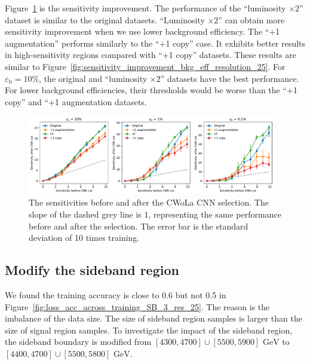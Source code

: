 \documentclass[12pt]{article}
\begin{document}
		Figure~\ref{fig:sensitivity_improvement_aug_1_x2_copy_1_res_25} is the sensitivity improvement. The performance of the ``luminosity $\times 2$'' dataset is similar to the original datasets. ``Luminosity $\times 2$'' can obtain more sensitivity improvement when we use lower background efficiency. The ``+1 augmentation'' performs similarly to the ``+1 copy'' case. It exhibits better results in high-sensitivity regions compared with ``+1 copy'' datasets. These results are similar to Figure~\ref{fig:sensitivity_improvement_bkg_eff_resolution_25}. For $\varepsilon_{\text{b}} = 10 \%$, the original and ``luminosity $\times 2$'' datasets have the best performance. For lower background efficiencies, their thresholds would be worse than the ``+1 copy'' and ``+1 augmentation datasets.
		\begin{figure}[htpb]
			\centering
			\includegraphics[width=0.97\textwidth]{HVmodel_sensitivity_improvement_origin_aug_1_x2_copy_1_res_25.pdf}
			\caption{The sensitivities before and after the CWoLa CNN selection. The slope of the dashed grey line is $1$, representing the same performance before and after the selection. The error bar is the standard deviation of 10 times training.}
			\label{fig:sensitivity_improvement_aug_1_x2_copy_1_res_25}
		\end{figure}
	\subsection{Modify the sideband region}%
	\label{sub:modify_the_sideband_region}
		We found the training accuracy is close to 0.6 but not 0.5 in Figure~\ref{fig:loss_acc_across_training_SB_3_res_25}. The reason is the imbalance of the data size. The size of sideband region samples is larger than the size of signal region samples. To investigate the impact of the sideband region, the sideband boundary is modified from $[4300,4700] \cup [5500,5900] \text{ GeV}$ to $[4400,4700] \cup [5500,5800] \text{ GeV}$.
\end{document}
